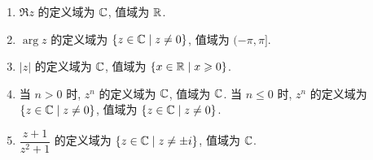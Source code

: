 \begin{enumerate}
	\item $\Re z$ 的定义域为 ${\mathbb{C}}$, 值域为 ${\mathbb{R}}$.
	\item $\arg z$ 的定义域为 $\{z\in{\mathbb{C}}\mid z\neq 0\}$, 值域为 $(-\pi,\pi]$.
	\item $|z|$ 的定义域为 ${\mathbb{C}}$, 值域为 $\{x\in{\mathbb{R}}\mid x\geqslant0\}$.
	\item 当 $n>0$ 时, $z^n$ 的定义域为 ${\mathbb{C}}$, 值域为 ${\mathbb{C}}$.
	当 $n\le 0$ 时, $z^n$ 的定义域为 $\{z\in{\mathbb{C}}\mid z\neq 0\}$, 值域为 $\{z\in{\mathbb{C}}\mid z\neq 0\}$.
	\item $\dfrac{z+1}{z^2+1}$ 的定义域为 $\{z\in{\mathbb{C}}\mid z\neq \pm i\}$, 值域为 ${\mathbb{C}}$.
\end{enumerate}
